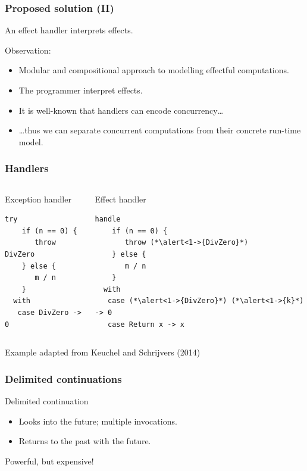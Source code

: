 \documentclass[10pt,compress]{beamer}
\begin{document}
  \begin{frame}
    \frametitle{Proposed solution (II)}
    \begin{definition}
      An effect handler interprets effects.
    \end{definition}
    Observation:
    \begin{itemize}
      \item Modular and compositional approach to modelling effectful computations.
      \item The programmer interpret effects.
      \item It is well-known that handlers can encode concurrency\dots
      \item \dots thus we can separate concurrent computations from their concrete run-time model.
    \end{itemize}
  \end{frame}

  \begin{frame}[containsverbatim]
    \frametitle{Handlers}
    \begin{columns}
      \begin{column}{0.5\textwidth}
Exception handler
\begin{lstlisting}[style=spacey]
  try
    if (n == 0) {
       throw DivZero
    } else {
       m / n
    }
  with
   case DivZero -> 0
\end{lstlisting}        
      \end{column}
      \begin{column}{0.5\textwidth}
Effect handler        
\begin{lstlisting}[style=spacey]
  handle
    if (n == 0) {
       throw (*\alert<1->{DivZero}*)
    } else {
       m / n
    }
  with
   case (*\alert<1->{DivZero}*) (*\alert<1->{k}*) -> 0
   case Return x -> x
\end{lstlisting}    
      \end{column}
    \end{columns}
\tiny{Example adapted from Keuchel and Schrijvers (2014)}
  \end{frame}

  \begin{frame}
    \frametitle{Delimited continuations}
    Delimited continuation
    \begin{itemize}
      \item Looks into the future; multiple invocations.
      \item Returns to the past with the future.
    \end{itemize}
    Powerful, but expensive!
  \end{frame}
\end{document}
